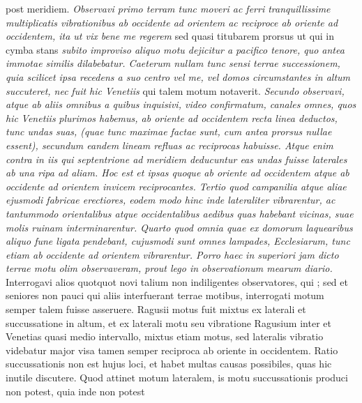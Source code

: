  post meridiem. \textit{Observavi primo terram tunc moveri ac ferri tranquillissime multiplicatis vibrationibus ab occidente ad orientem ac reciproce ab oriente ad occidentem, ita ut vix bene me regerem} sed quasi titubarem prorsus ut qui in cymba stans \textit{subito improviso aliquo motu dejicitur a pacifico tenore, quo antea immotae similis dilabebatur. Caeterum nullam tunc sensi terrae successionem, quia scilicet ipsa recedens a suo centro vel me, vel domos circumstantes in altum succuteret, nec }\textit{ fuit hic }\textit{Venetiis}\protect{} qui talem motum notaverit. \textit{Secundo observavi, atque ab aliis omnibus a quibus inquisivi, video confirmatum, canales omnes, quos hic }\textit{Venetiis}\protect{}\textit{ plurimos habemus, ab oriente ad occidentem recta linea deductos, tunc undas suas, (quae tunc maximae factae sunt, cum antea prorsus nullae essent), secundum eandem lineam refluas ac reciprocas habuisse. Atque enim contra in iis qui septentrione ad meridiem deducuntur eas undas fuisse laterales ab una ripa ad aliam. Hoc est et ipsas quoque ab oriente ad occidentem atque ab occidente ad orientem invicem reciprocantes. Tertio quod campanilia atque aliae ejusmodi fabricae erectiores, eodem modo hinc inde lateraliter vibrarentur, ac tantummodo orientalibus atque occidentalibus aedibus quas habebant vicinas, suae molis ruinam interminarentur. Quarto quod omnia quae ex domorum laquearibus aliquo fune ligata pendebant, cujusmodi sunt omnes lampades, Ecclesiarum, tunc etiam ab occidente ad orientem vibrarentur. Porro haec }\textit{ in superiori jam dicto terrae motu olim observaveram, prout lego in observationum mearum diario.} Interrogavi alios quotquot novi talium non indiligentes observatores, qui ; sed et seniores non pauci qui aliis interfuerant terrae motibus, interrogati  motum semper talem fuisse asseruere. Ragusii motus fuit mixtus ex laterali et succussatione in altum, et ex laterali motu seu vibratione Ragusium\protect{} inter et Venetias\protect{} quasi medio intervallo, mixtus etiam motus, sed lateralis vibratio videbatur major visa tamen semper reciproca ab oriente in occidentem. Ratio succussationis non est hujus loci, et habet multas causas possibiles, quas hic inutile discutere. Quod attinet motum lateralem, is  motu succussationis produci non potest, quia inde non  potest 